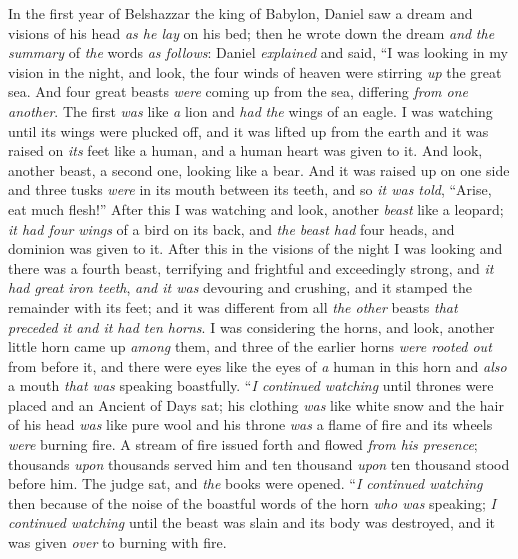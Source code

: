 \begin{biblechapter} %
 In the first year of Belshazzar the king of Babylon, Daniel saw a dream and visions of his head \textit{as he lay} on his bed; then he wrote down the dream \textit{and} \textit{the} \textit{summary} of \textit{the} words \textit{as follows}:
\verse Daniel \textit{explained} and said, “I was looking in my vision in the night, and look, the four winds of heaven were stirring \textit{up} the great sea.
\verse And four great beasts \textit{were} coming up from the sea, differing \textit{from one another}.
\verse The first \textit{was} like \textit{a} lion and \textit{had} \textit{the} wings of an eagle. I was watching until its wings were plucked off, and it was lifted up from the earth and it was raised on \textit{its} feet like a human, and a human heart was given to it.
\verse And look, another beast, a second one, looking like a bear. And it was raised up on one side and three tusks \textit{were} in its mouth between its teeth, and so \textit{it was told}, “Arise, eat much flesh!”
\verse After this I was watching and look, another \textit{beast} like a leopard; \textit{it had four wings} of a bird on its back, and \textit{the beast had} four heads, and dominion was given to it.
\verse After this in the visions of the night I was looking and there was a fourth beast, terrifying and frightful and exceedingly strong, and \textit{it had} \textit{great iron teeth}, \textit{and it was} devouring and crushing, and it stamped the remainder with its feet; and it was different from all \textit{the other} beasts \textit{that preceded it} \textit{and it had ten horns}.
\verse I was considering the horns, and look, another little horn came up \textit{among} them, and three of the earlier horns \textit{were rooted out} from before it, and there were eyes like the eyes of \textit{a} human in this horn and \textit{also} a mouth \textit{that was} speaking boastfully.
\verse “\textit{I continued watching} until thrones were placed and an Ancient of Days sat; his clothing \textit{was} like white snow and the hair of his head \textit{was} like pure wool and his throne \textit{was} a flame of fire and its wheels \textit{were} burning fire.
\verse A stream of fire issued forth and flowed \textit{from his presence}; thousands \textit{upon} thousands served him and ten thousand \textit{upon} ten thousand stood before him. The judge sat, and \textit{the} books were opened.
\verse “\textit{I continued watching} then because of the noise of the boastful words of the horn \textit{who was} speaking; \textit{I continued watching} until the beast was slain and its body was destroyed, and it was given \textit{over} to burning with fire.

\end{biblechapter}
